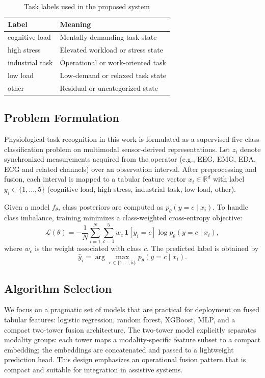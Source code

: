 \documentclass{llncs}
\begin{document}
\begin{table}[!h]
\caption{Task labels used in the proposed system}
\label{tab:labels}
\centering
\begin{tabular}{ll}
\hline
Label & Meaning \\
\hline
cognitive load & Mentally demanding task state \\
high stress & Elevated workload or stress state \\
industrial task & Operational or work-oriented task \\
low load & Low-demand or relaxed task state \\
other & Residual or uncategorized state \\
\hline
\end{tabular}
\end{table}



\subsection{Problem Formulation}
Physiological task recognition in this work is formulated as a supervised five-class classification problem on multimodal sensor-derived representations. Let $z_i$ denote synchronized measurements acquired from the operator (e.g., EEG, EMG, EDA, ECG and related channels) over an observation interval. After preprocessing and fusion, each interval is mapped to a tabular feature vector $x_i \in \mathbb{R}^{d}$ with label $y_i \in \{1,\ldots,5\}$ (cognitive load, high stress, industrial task, low load, other).

Given a model $f_\theta$, class posteriors are computed as $p_\theta(y=c\mid x_i)$. To handle class imbalance, training minimizes a class-weighted cross-entropy objective:
\begin{equation}
\mathcal{L}(\theta)= -\frac{1}{N}\sum_{i=1}^{N}\sum_{c=1}^{5} w_c\,\mathbf{1}[y_i=c] \log p_\theta(y=c\mid x_i),
\end{equation}
where $w_c$ is the weight associated with class $c$. The predicted label is obtained by
\begin{equation}
\hat{y}_i = \arg\max_{c\in\{1,\ldots,5\}} p_\theta(y=c\mid x_i).
\end{equation}




\subsection{Algorithm Selection}
We focus on a pragmatic set of models that are practical for deployment on fused tabular features: logistic regression, random forest, \ac{XGBoost}, \ac{MLP}, and a compact two-tower fusion architecture. The two-tower model explicitly separates modality groups: each tower maps a modality-specific feature subset to a compact embedding; the embeddings are concatenated and passed to a lightweight prediction head. This design emphasizes an operational fusion pattern that is compact and suitable for integration in assistive systems.
\end{document}
